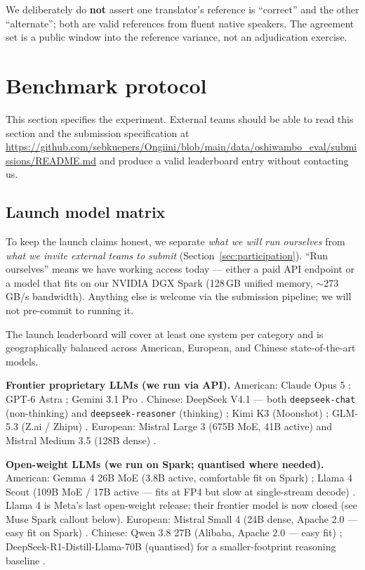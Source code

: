 \documentclass[11pt]{article}
\begin{document}
We deliberately do \textbf{not} assert one translator's reference is
``correct'' and the other ``alternate''; both are valid references
from fluent native speakers. The agreement set is a public window
into the reference variance, not an adjudication exercise.

\section{Benchmark protocol}
\label{sec:protocol}

This section specifies the experiment. External teams should be
able to read this section and the submission specification at
\url{https://github.com/sebkuepers/Ongiini/blob/main/data/oshiwambo_eval/submissions/README.md}
and produce a valid leaderboard entry without contacting us.

\subsection{Launch model matrix}
\label{sec:matrix}

To keep the launch claims honest, we separate \emph{what we will
run ourselves} from \emph{what we invite external teams to submit}
(Section~\ref{sec:participation}). ``Run ourselves'' means we have
working access today --- either a paid API endpoint or a model that
fits on our NVIDIA DGX Spark (128\,GB unified memory, $\sim
273$\,GB/s bandwidth). Anything else is welcome via the submission
pipeline; we will not pre-commit to running it.

The launch leaderboard will cover at least one system per category
and is geographically balanced across American, European, and
Chinese state-of-the-art models.

\textbf{Frontier proprietary LLMs (we run via API).} American:
Claude Opus 5 \citep{anthropic2026opus5}; GPT-6 Astra
\citep{openai2026gpt6}; Gemini 3.1 Pro \citep{google2026gemini3}.
Chinese: DeepSeek V4.1 --- both \texttt{deepseek-chat} (non-thinking)
and \texttt{deepseek-reasoner} (thinking) \citep{deepseek2026v41};
Kimi K3 (Moonshot) \citep{moonshot2026kimi3}; GLM-5.3 (Z.ai / Zhipu)
\citep{zai2026glm53}. European: Mistral Large 3 (675B MoE,
41B active) \citep{mistral2025large3} and Mistral Medium 3.5
(128B dense) \citep{mistral2026medium35}.

\textbf{Open-weight LLMs (we run on Spark; quantised where needed).}
American: Gemma 4 26B MoE (3.8B active, comfortable fit on Spark)
\citep{google2026gemma4}; Llama 4 Scout (109B MoE / 17B active ---
fits at FP4 but slow at single-stream decode)
\citep{touvron2025llama4}. Llama 4 is Meta's last open-weight
release; their frontier model is now closed (see Muse Spark callout
below). European: Mistral Small 4 (24B dense, Apache 2.0 ---
easy fit on Spark) \citep{mistral2026small4}. Chinese: Qwen 3.8 27B
(Alibaba, Apache 2.0 --- easy fit) \citep{yang2026qwen38};
DeepSeek-R1-Distill-Llama-70B (quantised) for a smaller-footprint
reasoning baseline \citep{deepseek2026v41}.
\end{document}
